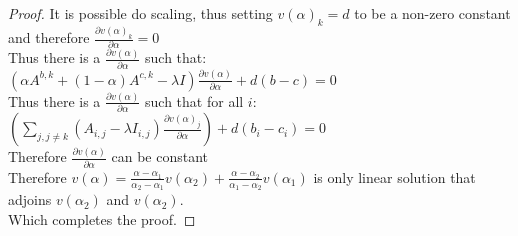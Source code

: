 \begin{proof}
\-\hspace{8mm}It is possible do scaling, thus setting $v(\alpha)_k=d$ to be a non-zero constant and therefore $\frac{\partial v(\alpha)_k}{\partial \alpha}=0$\\
\-\hspace{8mm}Thus there is a $\frac{\partial v(\alpha)}{\partial\alpha}$ such that: $\left(\alpha A^{b,k} + (1-\alpha)A^{c,k} - \lambda I\right)\frac{\partial v(\alpha)}{\partial\alpha}+d(b-c)=0$\\
\-\hspace{8mm}Thus there is a $\frac{\partial v(\alpha)}{\partial\alpha}$ such that for all $i$: $\left(\sum_{j,j\ne k}\left(A_{i,j}-\lambda I_{i,j}\right)\frac{\partial v(\alpha)_j}{\partial\alpha}\right) +d(b_i-c_i)=0 $\\
\-\hspace{8mm}Therefore $\frac{\partial v(\alpha)}{\partial\alpha}$ can be constant\\
\-\hspace{8mm}Therefore $v(\alpha)=\frac{\alpha-\alpha_1}{\alpha_2-\alpha_1}v(\alpha_2)+\frac{\alpha-\alpha_2}{\alpha_1-\alpha_2}v(\alpha_1)$ is only linear solution that adjoins $v(\alpha_2)$ and $v(\alpha_2)$.\\
Which completes the proof.
\end{proof}



